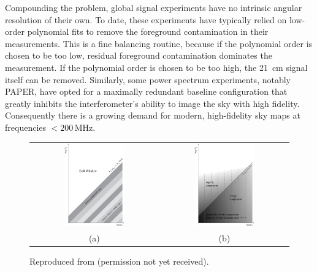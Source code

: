 \begin{bibunit}
Compounding the problem, global signal experiments have no intrinsic angular resolution of their
own. To date, these experiments have typically relied on low-order polynomial fits to remove the
foreground contamination in their measurements. This is a fine balancing routine, because if the
polynomial order is chosen to be too low, residual foreground contamination dominates the
measurement. If the polynomial order is chosen to be too high, the 21~cm signal itself can be
removed. Similarly, some power spectrum experiments, notably PAPER, have opted for a maximally
redundant baseline configuration that greatly inhibits the interferometer's ability to image the sky
with high fidelity. Consequently there is a growing demand for modern, high-fidelity sky maps at
frequencies $<200\,\text{MHz}$.

\begin{figure}
    \centering
    \begin{tabular}{cc}
        \includegraphics[width=0.49\textwidth]{figures/chapter1/morales-foreground-wedge-illustration} &
        \includegraphics[width=0.49\textwidth]{figures/chapter1/morales-foreground-wedge-calibration-errors} \\
        (a) & (b) \\
    \end{tabular}
    \caption{
        Reproduced from \citet{2012ApJ...752..137M} (permission not yet received).
    }
    \label{fig:morales-foreground-wedge}
\end{figure}


\end{bibunit}
